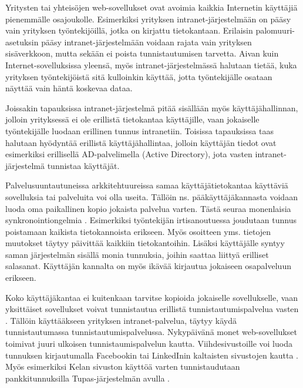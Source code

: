 Yritysten tai yhteisöjen web-sovellukset ovat avoimia kaikkia Internetin käyttäjiä pienemmälle osajoukolle. Esimerkiksi yrityksen intranet-järjestelmään on pääsy vain yrityksen työntekijöillä, jotka on kirjattu tietokantaan. Erilaisin palomuuri-asetuksin pääsy intranet-järjestelmään voidaan rajata vain yrityksen sisäverkkoon, mutta sekään ei poista tunnistautumisen tarvetta. Aivan kuin Internet-sovelluksissa yleensä, myös intranet-järjestelmässä halutaan tietää, kuka yrityksen työntekijöistä sitä kulloinkin käyttää, jotta työntekijälle osataan näyttää vain häntä koskevaa dataa.

Joissakin tapauksissa intranet-järjestelmä pitää sisällään myös käyttäjähallinnan, jolloin yrityksessä ei ole erillistä tietokantaa käyttäjille, vaan jokaiselle työntekijälle luodaan erillinen tunnus intranetiin. Toisissa tapauksissa taas halutaan hyödyntää erillistä käyttäjähallintaa, jolloin käyttäjän tiedot ovat esimerkiksi erillisellä AD-palvelimella (Active Directory), jota vasten intranet-järjestelmä tunnistaa käyttäjät.

Palvelusuuntautuneissa arkkitehtuureissa samaa käyttäjätietokantaa käyttäviä sovelluksia tai palveluita voi olla useita. Tällöin ns. pääkäyttäjäkannasta voidaan luoda oma paikallinen kopio jokaista palvelua varten. Tästä seuraa monenlaisia synkronointiongelmia \cite{synkronointi}. Esimerkiksi työntekijän irtisanoutuessa joudutaan tunnus poistamaan kaikista tietokannoista erikseen. Myös osoitteen yms. tietojen muutokset täytyy päivittää kaikkiin tietokantoihin. Lisäksi käyttäjälle syntyy saman järjestelmän sisällä monia tunnuksia, joihin saattaa liittyä erilliset salasanat. Käyttäjän kannalta on myös ikävää kirjautua jokaiseen osapalveluun erikseen.

Koko käyttäjäkantaa ei kuitenkaan tarvitse kopioida jokaiselle sovellukselle, vaan yksittäiset sovellukset voivat tunnistautua erillistä tunnistautumispalvelua vasten \cite{facebook}. Tällöin käyttääkseen yrityksen intranet-palvelua, täytyy käydä tunnistautumassa tunnistautumispalvelussa. Nykypäivänä monet web-sovellukset toimivat juuri ulkoisen tunnistaumispalvelun kautta. Viihdesivustoille voi luoda tunnuksen kirjautumalla Facebookin tai LinkedInin kaltaisten sivustojen kautta \cite{facebook}. Myös esimerkiksi Kelan sivuston käyttöä varten tunnistaudutaan pankkitunnuksilla Tupas-järjestelmän avulla \cite{tupas}.